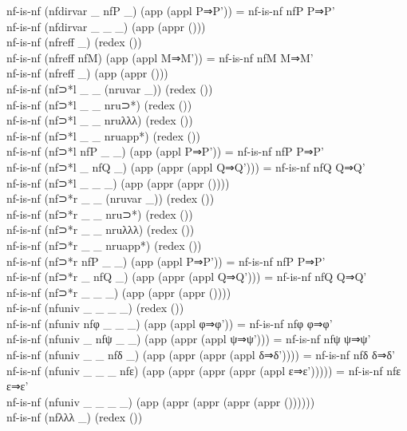 {\begin{code}
{\>nf-is-nf (nfdirvar \_ nfP \_) (app (appl P⇒P')) = nf-is-nf nfP P⇒P'\<\\
\>nf-is-nf (nfdirvar \_ \_ \_) (app (appr ()))\<\\
\>nf-is-nf (nfreff \_) (redex ())\<\\
\>nf-is-nf (nfreff nfM) (app (appl M⇒M')) = nf-is-nf nfM M⇒M'\<\\
\>nf-is-nf (nfreff \_) (app (appr ()))\<\\
\>nf-is-nf (nf⊃*l \_ \_ (nruvar \_)) (redex ()) \<\\
\>nf-is-nf (nf⊃*l \_ \_ nru⊃*) (redex ()) \<\\
\>nf-is-nf (nf⊃*l \_ \_ nruλλλ) (redex ()) \<\\
\>nf-is-nf (nf⊃*l \_ \_ nruapp*) (redex ()) \<\\
\>nf-is-nf (nf⊃*l nfP \_ \_) (app (appl P⇒P')) = nf-is-nf nfP P⇒P'\<\\
\>nf-is-nf (nf⊃*l \_ nfQ \_) (app (appr (appl Q⇒Q'))) = nf-is-nf nfQ Q⇒Q'\<\\
\>nf-is-nf (nf⊃*l \_ \_ \_) (app (appr (appr ())))\<\\
\>nf-is-nf (nf⊃*r \_ \_ (nruvar \_)) (redex ()) \<\\
\>nf-is-nf (nf⊃*r \_ \_ nru⊃*) (redex ()) \<\\
\>nf-is-nf (nf⊃*r \_ \_ nruλλλ) (redex ()) \<\\
\>nf-is-nf (nf⊃*r \_ \_ nruapp*) (redex ()) \<\\
\>nf-is-nf (nf⊃*r nfP \_ \_) (app (appl P⇒P')) = nf-is-nf nfP P⇒P'\<\\
\>nf-is-nf (nf⊃*r \_ nfQ \_) (app (appr (appl Q⇒Q'))) = nf-is-nf nfQ Q⇒Q'\<\\
\>nf-is-nf (nf⊃*r \_ \_ \_) (app (appr (appr ())))\<\\
\>nf-is-nf (nfuniv \_ \_ \_ \_) (redex ())\<\\
\>nf-is-nf (nfuniv nfφ \_ \_ \_) (app (appl φ⇒φ')) = nf-is-nf nfφ φ⇒φ'\<\\
\>nf-is-nf (nfuniv \_ nfψ \_ \_) (app (appr (appl ψ⇒ψ'))) = nf-is-nf nfψ ψ⇒ψ'\<\\
\>nf-is-nf (nfuniv \_ \_ nfδ \_) (app (appr (appr (appl δ⇒δ')))) = nf-is-nf nfδ δ⇒δ'\<\\
\>nf-is-nf (nfuniv \_ \_ \_ nfε) (app (appr (appr (appr (appl ε⇒ε'))))) = nf-is-nf nfε ε⇒ε'\<\\
\>nf-is-nf (nfuniv \_ \_ \_ \_) (app (appr (appr (appr (appr ())))))\<\\
\>nf-is-nf (nfλλλ \_) (redex ())\<\\
}
\end{code}}
